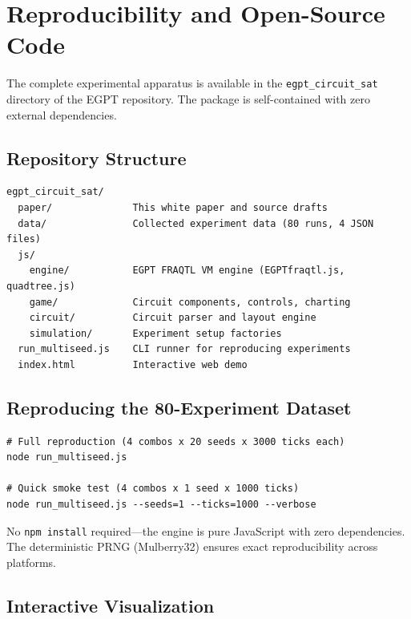 \documentclass[11pt,a4paper]{article}
\begin{document}
\appendix

\section{Reproducibility and Open-Source Code}
\label{app:reproduce}

The complete experimental apparatus is available in the \texttt{egpt\_circuit\_sat} directory of the EGPT repository. The package is self-contained with zero external dependencies.

\subsection{Repository Structure}

\begin{verbatim}
egpt_circuit_sat/
  paper/              This white paper and source drafts
  data/               Collected experiment data (80 runs, 4 JSON files)
  js/
    engine/           EGPT FRAQTL VM engine (EGPTfraqtl.js, quadtree.js)
    game/             Circuit components, controls, charting
    circuit/          Circuit parser and layout engine
    simulation/       Experiment setup factories
  run_multiseed.js    CLI runner for reproducing experiments
  index.html          Interactive web demo
\end{verbatim}

\subsection{Reproducing the 80-Experiment Dataset}

\begin{verbatim}
# Full reproduction (4 combos x 20 seeds x 3000 ticks each)
node run_multiseed.js

# Quick smoke test (4 combos x 1 seed x 1000 ticks)
node run_multiseed.js --seeds=1 --ticks=1000 --verbose
\end{verbatim}

No \texttt{npm install} required---the engine is pure JavaScript with zero dependencies. The deterministic PRNG (Mulberry32) ensures exact reproducibility across platforms.

\subsection{Interactive Visualization}
\end{document}
